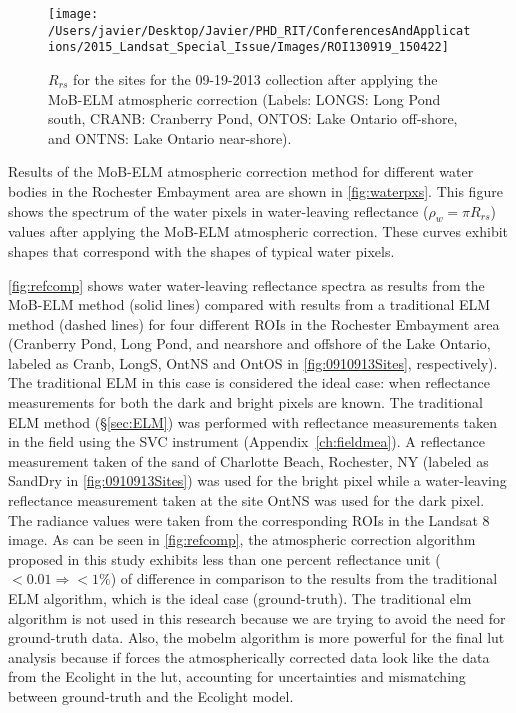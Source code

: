 \begin{figure}[htbp!]
  \centering
  \texttt{[image: /Users/javier/Desktop/Javier/PHD\_RIT/ConferencesAndApplications/2015\_Landsat\_Special\_Issue/Images/ROI130919\_150422]}

  \caption[$R_{rs}$ for the sites for the 09-19-2013 collection after applying the MoB-ELM atmospheric correction.]{$R_{rs}$ for the sites for the 09-19-2013 collection after applying the MoB-ELM atmospheric correction (Labels: LONGS: Long Pond south, CRANB: Cranberry Pond, ONTOS: Lake Ontario off-shore, and ONTNS: Lake Ontario near-shore). \label{fig:RrsROIs_130919}} 
\end{figure}

Results of the MoB-ELM atmospheric correction method for different water bodies in the Rochester Embayment area are shown in \autoref{fig:waterpxs}. This figure shows the spectrum of the water pixels in water-leaving reflectance ($\rho_w=\pi R_{rs}$) values after applying the MoB-ELM atmospheric correction. These curves exhibit shapes that correspond with the shapes of typical water pixels. 

\autoref{fig:refcomp} shows water water-leaving reflectance spectra as results from the MoB-ELM method (solid lines) compared with results from a traditional ELM method (dashed lines) for four different ROIs in the Rochester Embayment area (Cranberry Pond, Long Pond, and nearshore and offshore of the Lake Ontario, labeled as Cranb, LongS, OntNS and OntOS in \autoref{fig:0910913Sites}, respectively). The traditional ELM in this case is considered the ideal case: when reflectance measurements for both the dark and bright pixels are known. The traditional ELM method (\S\ref{sec:ELM}) was performed with reflectance measurements taken in the field using the SVC instrument \citep{SVCHR1024i} (Appendix~\ref{ch:fieldmea}). A reflectance measurement taken of the sand of Charlotte Beach, Rochester, NY (labeled as SandDry in \autoref{fig:0910913Sites}) was used for the bright pixel while a water-leaving reflectance measurement taken at the site OntNS was used for the dark pixel. The radiance values were taken from the corresponding ROIs in the Landsat 8 image. As can be seen in \autoref{fig:refcomp}, the atmospheric correction algorithm proposed in this study exhibits less than one percent reflectance unit ($<0.01\Rightarrow <1\%$) of difference in comparison to the results from the traditional ELM algorithm, which is the ideal case (ground-truth). The traditional \gls{elm} algorithm is not used in this research because we are trying to avoid the need for ground-truth data. Also, the \gls{mobelm} algorithm is more powerful for the final \gls{lut} analysis because if forces the atmospherically corrected data look like the data from the Ecolight in the \gls{lut}, accounting for uncertainties and mismatching between ground-truth and the Ecolight model.

